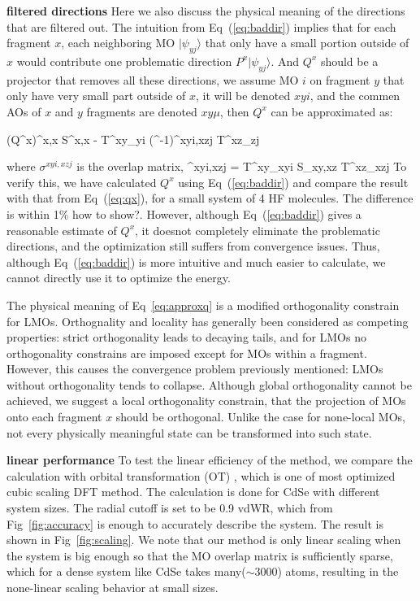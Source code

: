 \documentclass[prl,twocolumn,showpacs]{revtex4}
\begin{document}
\textbf{filtered directions}
Here we also discuss the physical meaning of the directions that are filtered out. The intuition from Eq~(\ref{eq:baddir}) implies that for each fragment $x$, each neighboring MO $|\psi_{yj}\rangle$ that only have a small portion outside of $x$ would contribute one problematic direction $P^x | \psi_{yj}\rangle$. And $Q^x$ should be a projector that removes all these directions, we assume MO $i$ on fragment $y$ that only have very small part outside of $x$, it will be denoted $xyi$, and the commen AOs of $x$ and $y$ fragments are denoted $xy\mu$, then $Q^x$ can be approximated as:

\bea
(Q^x)^{x\mu,x\nu} \approx S^{x\mu,x\nu} - T^{xy\mu}_{yi} (\sigma^{-1})^{xyi,xzj} T^{xz\mu}_{zj}
\label{eq:approxq}
\eea

where $\sigma^{xyi,xzj}$ is the overlap matrix,
\bea
\sigma^{xyi,xzj} = T^{xy\mu}_{xyi} S_{xy\mu,xz\nu} T^{xz\nu}_{xzj}
\eea
To verify this, we have calculated $Q^x$ using Eq~(\ref{eq:baddir}) and compare the result with that from Eq~(\ref{eq:qx}), for a small system of 4 HF molecules. The difference is within 1\% \new how to show?\old. However, although Eq~(\ref{eq:baddir}) gives a reasonable estimate of $Q^x$, it doesnot completely eliminate the problematic directions, and the optimization still suffers from convergence issues. Thus, although Eq~(\ref{eq:baddir}) is more intuitive and much easier to calculate, we cannot directly use it to optimize the energy.

The physical meaning of Eq~\ref{eq:approxq} is a modified orthogonality constrain for LMOs. Orthognality and locality has generally been considered as competing properties: strict orthogonality leads to decaying tails, and for LMOs no orthogonality constrains are imposed except for MOs within a fragment. However, this causes the convergence problem previously mentioned: LMOs without orthogonality tends to collapse. Although global orthogonality cannot be achieved, we suggest a local orthogonality constrain, that the projection of MOs onto each fragment $x$ should be orthogonal. Unlike the case for none-local MOs, not every physically meaningful state can be transformed into such state.

\textbf{linear performance}
To test the linear efficiency of the method, we compare the calculation with orbital transformation (OT) \cite{weber2008direct,vandevondele2003efficient}, which is one of most optimized cubic scaling DFT method. The calculation is done for CdSe with different system sizes. The radial cutoff is set to be 0.9 vdWR, which from Fig~\ref{fig:accuracy} is enough to accurately describe the system. The result is shown in Fig~\ref{fig:scaling}. We note that our method is only linear scaling when the system is big enough so that the MO overlap matrix is sufficiently sparse, which for a dense system like CdSe takes many($\sim 3000$) atoms, resulting in the none-linear scaling behavior at small sizes.
\end{document}
